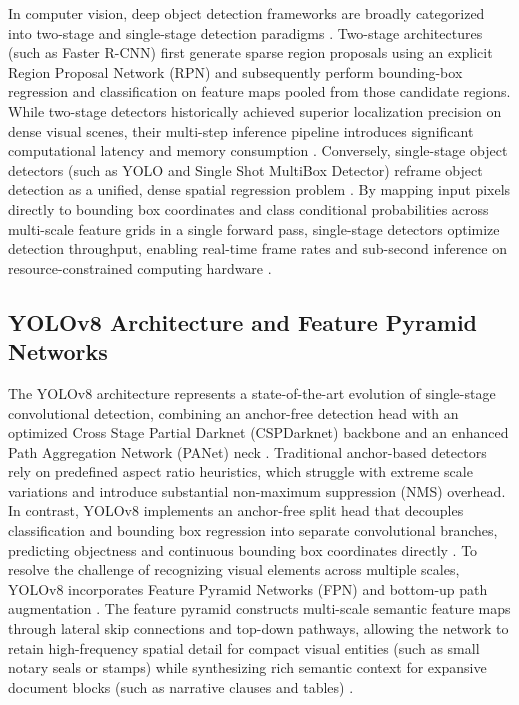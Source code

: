 In computer vision, deep object detection frameworks are broadly categorized into two-stage and single-stage detection paradigms \cite{ref28}.
Two-stage architectures (such as Faster R-CNN) first generate sparse region proposals using an explicit Region Proposal Network (RPN) and subsequently perform bounding-box regression and classification on feature maps pooled from those candidate regions.
While two-stage detectors historically achieved superior localization precision on dense visual scenes, their multi-step inference pipeline introduces significant computational latency and memory consumption \cite{ref28, ref29}.
Conversely, single-stage object detectors (such as YOLO and Single Shot MultiBox Detector) reframe object detection as a unified, dense spatial regression problem \cite{ref28, ref29}.
By mapping input pixels directly to bounding box coordinates and class conditional probabilities across multi-scale feature grids in a single forward pass, single-stage detectors optimize detection throughput, enabling real-time frame rates and sub-second inference on resource-constrained computing hardware \cite{ref28, ref29}.

\subsection{YOLOv8 Architecture and Feature Pyramid Networks}

The YOLOv8 architecture represents a state-of-the-art evolution of single-stage convolutional detection, combining an anchor-free detection head with an optimized Cross Stage Partial Darknet (CSPDarknet) backbone and an enhanced Path Aggregation Network (PANet) neck \cite{ref30, ref31}.
Traditional anchor-based detectors rely on predefined aspect ratio heuristics, which struggle with extreme scale variations and introduce substantial non-maximum suppression (NMS) overhead.
In contrast, YOLOv8 implements an anchor-free split head that decouples classification and bounding box regression into separate convolutional branches, predicting objectness and continuous bounding box coordinates directly \cite{ref31}.
To resolve the challenge of recognizing visual elements across multiple scales, YOLOv8 incorporates Feature Pyramid Networks (FPN) and bottom-up path augmentation \cite{ref30}.
The feature pyramid constructs multi-scale semantic feature maps through lateral skip connections and top-down pathways, allowing the network to retain high-frequency spatial detail for compact visual entities (such as small notary seals or stamps) while synthesizing rich semantic context for expansive document blocks (such as narrative clauses and tables) \cite{ref30}.

